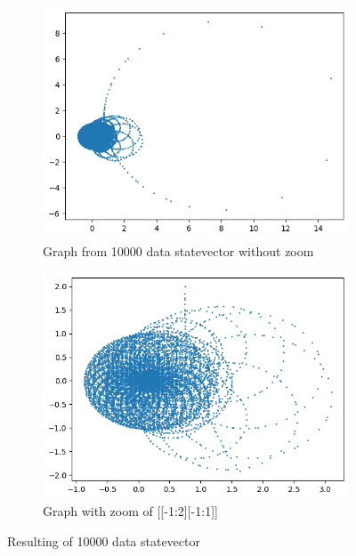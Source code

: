 \begin{figure}[ht!]
        \centering
        \begin{subfigure}[c]{0.5\textwidth}
                \includegraphics[width=\textwidth]{Chapitre1/Figures/exp1_100_baseH_nonZoom.png}
                \caption{Graph from 10000 data statevector without zoom}
        \end{subfigure}%
        \begin{subfigure}[c]{0.5\textwidth}
                \includegraphics[width=\textwidth]{Chapitre1/Figures/exp1_100_baseH_zoom.png}
                \caption{Graph with zoom of [[-1:2][-1:1]]}
        \end{subfigure}
        \caption{Resulting of 10000 data statevector}
\end{figure}

